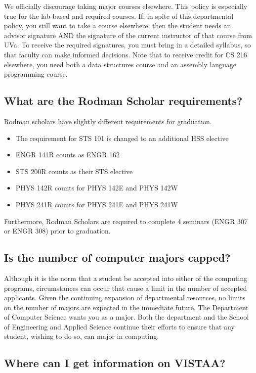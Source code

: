 \documentclass[12pt,twoside]{article}
\newenvironment{itemlist}{
\begin{itemize}
\setlength{\itemsep}{0pt}
\setlength{\parskip}{0pt}}
{\end{itemize}}
\begin{document}
We officially discourage taking major courses elsewhere. This policy
is especially true for the lab-based and required courses.  If, in
spite of this departmental policy, you still want to take a course
elsewhere, then the student needs an advisor signature AND the
signature of the current instructor of that course from UVa. To
receive the required signatures, you must bring in a detailed
syllabus, so that faculty can make informed decisions.  Note that to
receive credit for CS 216 elsewhere, you need both a data structures
course and an assembly language programming course.


\subsection{What are the Rodman Scholar requirements?}

Rodman scholars have slightly different requirements for graduation.

\begin{itemlist}
\item The requirement for STS 101 is changed to an additional HSS
elective
\item ENGR 141R counts as ENGR 162
\item STS 200R counts as their STS elective
\item PHYS 142R counts for PHYS 142E and PHYS 142W
\item PHYS 241R counts for PHYS 241E and PHYS 241W
\end{itemlist}

Furthermore, Rodman Scholars are required to complete 4 seminars (ENGR
307 or ENGR 308) prior to graduation.

\subsection{Is the number of computer majors capped?}

Although it is the norm that a student be accepted into either of the
computing programs, circumstances can occur that cause a limit in the
number of accepted applicants. Given the continuing expansion of
departmental resources, no limits on the number of majors are expected
in the immediate future. The Department of Computer Science wants you
as a major.  Both the department and the School of Engineering and
Applied Science continue their efforts to ensure that any
student, wishing to do so, can major in computing.

\subsection{Where can I get information on VISTAA?}
\end{document}
